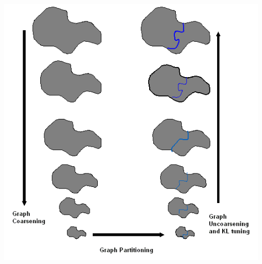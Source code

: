 \documentclass[compress,12pt]{beamer}
\begin{document}
\begin{frame}%
  \centerline{\includegraphics[height=.88\textheight]{figures/ML-Idea}}
\end{frame}
\end{document}
